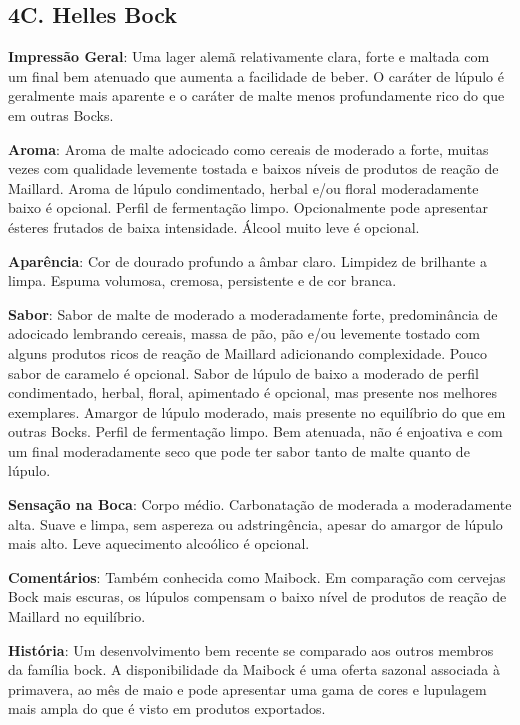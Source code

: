 \subsection*{4C. Helles Bock}
\textbf{Impressão Geral}: Uma lager alemã relativamente clara, forte e maltada com um final bem atenuado que aumenta a facilidade de beber. O caráter de lúpulo é geralmente mais aparente e o caráter de malte menos profundamente rico do que em outras Bocks.

\textbf{Aroma}: Aroma de malte adocicado como cereais de moderado a forte, muitas vezes com qualidade levemente tostada e baixos níveis de produtos de reação de Maillard. Aroma de lúpulo condimentado, herbal e/ou floral moderadamente baixo é opcional. Perfil de fermentação limpo. Opcionalmente pode apresentar ésteres frutados de baixa intensidade. Álcool muito leve é opcional.

\textbf{Aparência}: Cor de dourado profundo a âmbar claro. Limpidez de brilhante a limpa. Espuma volumosa, cremosa, persistente e de cor branca.

\textbf{Sabor}: Sabor de malte de moderado a moderadamente forte, predominância de adocicado lembrando cereais, massa de pão, pão e/ou levemente tostado com alguns produtos ricos de reação de Maillard adicionando complexidade. Pouco sabor de caramelo é opcional. Sabor de lúpulo de baixo a moderado de perfil condimentado, herbal, floral, apimentado é opcional, mas presente nos melhores exemplares. Amargor de lúpulo moderado, mais presente no equilíbrio do que em outras Bocks. Perfil de fermentação limpo. Bem atenuada, não é enjoativa e com um final moderadamente seco que pode ter sabor tanto de malte quanto de lúpulo.

\textbf{Sensação na Boca}: Corpo médio. Carbonatação de moderada a moderadamente alta. Suave e limpa, sem aspereza ou adstringência, apesar do amargor de lúpulo mais alto. Leve aquecimento alcoólico é opcional.

\textbf{Comentários}: Também conhecida como Maibock. Em comparação com cervejas Bock mais escuras, os lúpulos compensam o baixo nível de produtos de reação de Maillard no equilíbrio.

\textbf{História}: Um desenvolvimento bem recente se comparado aos outros membros da família bock. A disponibilidade da Maibock é uma oferta sazonal associada à primavera, ao mês de maio e pode apresentar uma gama de cores e lupulagem mais ampla do que é visto em produtos exportados.

